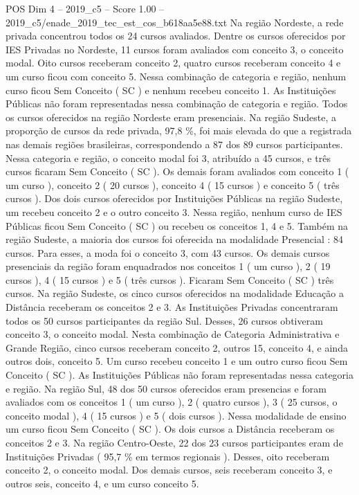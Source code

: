 \begin{textsample}{POS Dim 4 – 2019\_c5 – Score 1.00 – 2019\_c5/enade\_2019\_tec\_est\_cos\_b618aa5e88.txt}
Na região Nordeste, a rede privada concentrou todos os 24 cursos avaliados.
Dentre os cursos oferecidos por IES Privadas no Nordeste, 11 cursos foram avaliados com conceito 3, o conceito modal.
Oito cursos receberam conceito 2, quatro cursos receberam conceito 4 e um curso ficou com conceito 5.
Nessa combinação de categoria e região, nenhum curso ficou Sem Conceito ( SC ) e nenhum recebeu conceito 1.
As Instituições Públicas não foram representadas nessa combinação de categoria e região.
Todos os cursos oferecidos na região Nordeste eram presenciais.
Na região Sudeste, a proporção de cursos da rede privada, 97,8 \%, foi mais elevada do que a registrada nas demais regiões brasileiras, correspondendo a 87 dos 89 cursos participantes.
Nessa categoria e região, o conceito modal foi 3, atribuído a 45 cursos, e três cursos ficaram Sem Conceito ( SC ).
Os demais foram avaliados com conceito 1 ( um curso ), conceito 2 ( 20 cursos ), conceito 4 ( 15 cursos ) e conceito 5 ( três cursos ).
Dos dois cursos oferecidos por Instituições Públicas na região Sudeste, um recebeu conceito 2 e o outro conceito 3.
Nessa região, nenhum curso de IES Públicas ficou Sem Conceito ( SC ) ou recebeu os conceitos 1, 4 e 5.
Também na região Sudeste, a maioria dos cursos foi oferecida na modalidade Presencial : 84 cursos.
Para esses, a moda foi o conceito 3, com 43 cursos.
Os demais cursos presenciais da região foram enquadrados nos conceitos 1 ( um curso ), 2 ( 19 cursos ), 4 ( 15 cursos ) e 5 ( três cursos ).
Ficaram Sem Conceito ( SC ) três cursos.
Na região Sudeste, os cinco cursos oferecidos na modalidade Educação a Distância receberam os conceitos 2 e 3.
As Instituições Privadas concentraram todos os 50 cursos participantes da região Sul.
Desses, 26 cursos obtiveram conceito 3, o conceito modal.
Nesta combinação de Categoria Administrativa e Grande Região, cinco cursos receberam conceito 2, outros 15, conceito 4, e ainda outros dois, conceito 5.
Um curso recebeu conceito 1 e um outro curso ficou Sem Conceito ( SC ).
As Instituições Públicas não foram representadas nessa categoria e região.
Na região Sul, 48 dos 50 cursos oferecidos eram presencias e foram avaliados com os conceitos 1 ( um curso ), 2 ( quatro cursos ), 3 ( 25 cursos, o conceito modal ), 4 ( 15 cursos ) e 5 ( dois cursos ).
Nessa modalidade de ensino um curso ficou Sem Conceito ( SC ).
Os dois cursos a Distância receberam os conceitos 2 e 3.
Na região Centro-Oeste, 22 dos 23 cursos participantes eram de Instituições Privadas ( 95,7 \% em termos regionais ).
Desses, oito receberam conceito 2, o conceito modal.
Dos demais cursos, seis receberam conceito 3, e outros seis, conceito 4, e um curso conceito 5.

\end{textsample}
